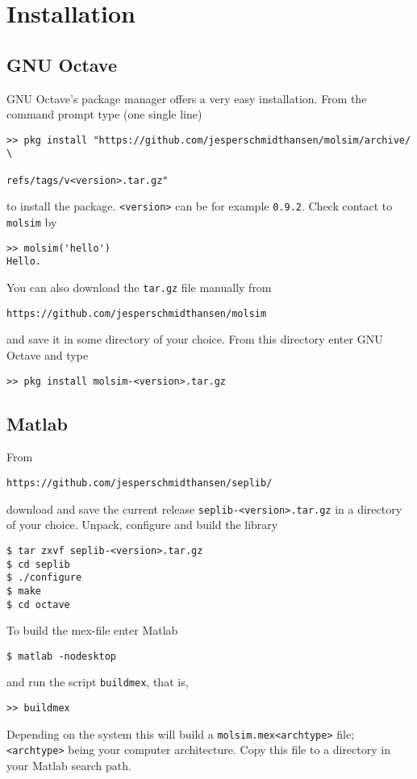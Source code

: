 \documentclass[11pt]{article}
\begin{document}
\section{Installation}\label{sec:install}
\subsection{GNU Octave}
GNU Octave's package manager offers a very easy installation. From the command
prompt type (one single line)
\begin{verbatim} 
>> pkg install "https://github.com/jesperschmidthansen/molsim/archive/ \
                                             refs/tags/v<version>.tar.gz"
\end{verbatim}
to install the package. \verb!<version>! can be for example \verb!0.9.2!. Check
contact to \verb!molsim! by
\begin{verbatim}
>> molsim('hello')
Hello. 
\end{verbatim}
You can also download the \verb!tar.gz! file manually from
\begin{verbatim}
https://github.com/jesperschmidthansen/molsim
\end{verbatim}
and save it in some directory of your choice. From this directory enter GNU
Octave and type
\begin{verbatim}
>> pkg install molsim-<version>.tar.gz 
\end{verbatim}
    
\subsection{Matlab}
From
\begin{verbatim}
https://github.com/jesperschmidthansen/seplib/
\end{verbatim}
\noindent download and save the current release \verb!seplib-<version>.tar.gz!
in a directory of your choice. Unpack, configure and build the library
\begin{verbatim}
$ tar zxvf seplib-<version>.tar.gz
$ cd seplib
$ ./configure
$ make
$ cd octave
\end{verbatim}
To build the \textsf{mex}-file enter Matlab
\begin{verbatim}
$ matlab -nodesktop
\end{verbatim}
and run the script \verb!buildmex!, that is, 
\begin{verbatim}
>> buildmex
\end{verbatim}
Depending on the system this will build a \verb!molsim.mex<archtype>!  file;
\verb!<archtype>! being your computer architecture. Copy this file to a
directory in your Matlab search path.
\end{document}
